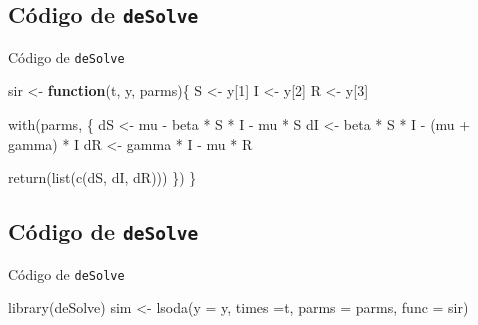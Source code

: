 \documentclass[
  11pt,
  ignorenonframetext,
]{beamer}
\newenvironment{Shaded}{}{}
\newcommand{\AttributeTok}[1]{\textcolor[rgb]{0.49,0.56,0.16}{#1}}
\newcommand{\ControlFlowTok}[1]{\textcolor[rgb]{0.00,0.44,0.13}{\textbf{#1}}}
\newcommand{\DecValTok}[1]{\textcolor[rgb]{0.25,0.63,0.44}{#1}}
\newcommand{\FunctionTok}[1]{\textcolor[rgb]{0.02,0.16,0.49}{#1}}
\newcommand{\NormalTok}[1]{#1}
\newcommand{\OtherTok}[1]{\textcolor[rgb]{0.00,0.44,0.13}{#1}}
\newcommand{\SpecialCharTok}[1]{\textcolor[rgb]{0.25,0.44,0.63}{#1}}
\begin{document}
\hypertarget{cuxf3digo-de-desolve-1}{%
\subsection{\texorpdfstring{Código de
\texttt{deSolve}}{Código de deSolve}}\label{cuxf3digo-de-desolve-1}}

\begin{frame}[fragile]{Código de \texttt{deSolve}}
\begin{Shaded}
\begin{Highlighting}[]
\NormalTok{sir }\OtherTok{\textless{}{-}} \ControlFlowTok{function}\NormalTok{(t, y, parms)\{}
\NormalTok{  S }\OtherTok{\textless{}{-}}\NormalTok{ y[}\DecValTok{1}\NormalTok{]}
\NormalTok{  I }\OtherTok{\textless{}{-}}\NormalTok{ y[}\DecValTok{2}\NormalTok{]}
\NormalTok{  R }\OtherTok{\textless{}{-}}\NormalTok{ y[}\DecValTok{3}\NormalTok{]}
  
  \FunctionTok{with}\NormalTok{(parms, \{}
\NormalTok{    dS }\OtherTok{\textless{}{-}}\NormalTok{ mu }\SpecialCharTok{{-}}\NormalTok{ beta }\SpecialCharTok{*}\NormalTok{ S }\SpecialCharTok{*}\NormalTok{ I  }\SpecialCharTok{{-}}\NormalTok{ mu }\SpecialCharTok{*}\NormalTok{ S}
\NormalTok{    dI }\OtherTok{\textless{}{-}}\NormalTok{ beta }\SpecialCharTok{*}\NormalTok{ S }\SpecialCharTok{*}\NormalTok{ I  }\SpecialCharTok{{-}}\NormalTok{ (mu }\SpecialCharTok{+}\NormalTok{ gamma) }\SpecialCharTok{*}\NormalTok{ I}
\NormalTok{    dR }\OtherTok{\textless{}{-}}\NormalTok{ gamma }\SpecialCharTok{*}\NormalTok{ I }\SpecialCharTok{{-}}\NormalTok{ mu }\SpecialCharTok{*}\NormalTok{ R}

    \FunctionTok{return}\NormalTok{(}\FunctionTok{list}\NormalTok{(}\FunctionTok{c}\NormalTok{(dS, dI, dR)))}
\NormalTok{    \})}
\NormalTok{\}}
\end{Highlighting}
\end{Shaded}
\end{frame}

\hypertarget{cuxf3digo-de-desolve-2}{%
\subsection{\texorpdfstring{Código de
\texttt{deSolve}}{Código de deSolve}}\label{cuxf3digo-de-desolve-2}}

\begin{frame}[fragile]{Código de \texttt{deSolve}}
\begin{Shaded}
\begin{Highlighting}[]
\FunctionTok{library}\NormalTok{(deSolve)}
\NormalTok{sim }\OtherTok{\textless{}{-}} \FunctionTok{lsoda}\NormalTok{(}\AttributeTok{y =}\NormalTok{ y, }\AttributeTok{times =}\NormalTok{t, }
             \AttributeTok{parms =}\NormalTok{ parms, }
             \AttributeTok{func =}\NormalTok{ sir)}
\end{Highlighting}
\end{Shaded}
\end{frame}
\end{document}
